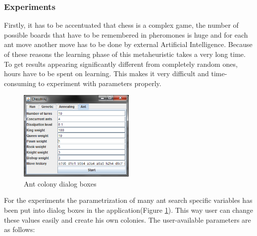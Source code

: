 \documentclass[pdftex]{article}
\begin{document}
\subsubsection{Experiments}

Firstly, it has to be accentuated that chess is a complex game, the number of possible boards that have to be remembered in pheromones is huge and for each ant move another move has to be done by external Artificial Intelligence. Because of these reasons the learning phase of this metaheuristic takes a very long time. To get results appearing significantly different from completely random ones, hours have to be spent on learning. This makes it very difficult and time-consuming to experiment with parameters properly.

\begin{figure}[!htb]
	\centering
	\includegraphics[width=0.5\textwidth]{ant/antapplication.png} 
	\caption{Ant colony dialog boxes}
	\label{fig:antapplication}
\end{figure}

For the experiments the parametrization of many ant search specific variables has been put into dialog boxes in the application(Figure \ref{fig:antapplication}). This way user can change these values easily and create his own colonies. The user-available parameters are as follows:
\end{document}
